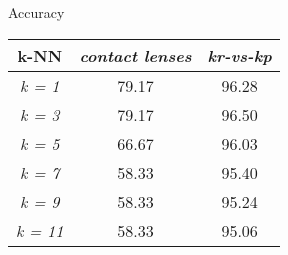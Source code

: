 
Accuracy

\begin{tabular}{c|c|c}
                k-NN       & \emph{contact lenses} & \emph{kr-vs-kp}  \\ \hline
				\emph{k = 1} & 79.17  & 96.28  \\ \hline
				\emph{k = 3} & 79.17  & 96.50  \\ \hline
				\emph{k = 5} & 66.67  & 96.03  \\ \hline
				\emph{k = 7} & 58.33  & 95.40  \\ \hline
				\emph{k = 9} & 58.33  & 95.24  \\ \hline
				\emph{k = 11} & 58.33  & 95.06  \\ \hline
\end{tabular}
